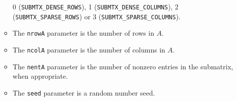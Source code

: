 \begin{enumerate}
\begin{itemize}
0 ({\tt SUBMTX\_DENSE\_ROWS}),
1 ({\tt SUBMTX\_DENSE\_COLUMNS}),
2 ({\tt SUBMTX\_SPARSE\_ROWS}) or
3 ({\tt SUBMTX\_SPARSE\_COLUMNS}).
\item
The {\tt nrowA} parameter is the number of rows in $A$.
\item
The {\tt ncolA} parameter is the number of columns in $A$.
\item
The {\tt nentA} parameter is the number of nonzero entries in the
submatrix, when appropriate.
\item
The {\tt seed} parameter is a random number seed.
\end{itemize}
\end{enumerate}
